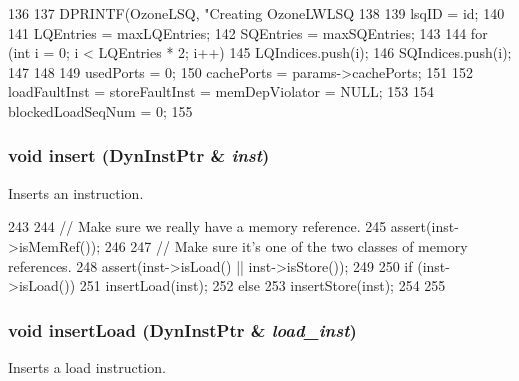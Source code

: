 \begin{DoxyCode}
136 {
137     DPRINTF(OzoneLSQ, "Creating OzoneLWLSQ%
138 
139     lsqID = id;
140 
141     LQEntries = maxLQEntries;
142     SQEntries = maxSQEntries;
143 
144     for (int i = 0; i < LQEntries * 2; i++) {
145         LQIndices.push(i);
146         SQIndices.push(i);
147     }
148 
149     usedPorts = 0;
150     cachePorts = params->cachePorts;
151 
152     loadFaultInst = storeFaultInst = memDepViolator = NULL;
153 
154     blockedLoadSeqNum = 0;
155 }
\end{DoxyCode}
\hypertarget{classOzoneLWLSQ_a773e88db1aa010c3755e603493bf40ec}{
\subsubsection[{insert}]{\setlength{\rightskip}{0pt plus 5cm}void insert ({\bf DynInstPtr} \& {\em inst})}}
\label{classOzoneLWLSQ_a773e88db1aa010c3755e603493bf40ec}
Inserts an instruction. 


\begin{DoxyCode}
243 {
244     // Make sure we really have a memory reference.
245     assert(inst->isMemRef());
246 
247     // Make sure it's one of the two classes of memory references.
248     assert(inst->isLoad() || inst->isStore());
249 
250     if (inst->isLoad()) {
251         insertLoad(inst);
252     } else {
253         insertStore(inst);
254     }
255 }
\end{DoxyCode}
\hypertarget{classOzoneLWLSQ_ad22b3ecafed2bcd9c59fcab049a1cb98}{
\subsubsection[{insertLoad}]{\setlength{\rightskip}{0pt plus 5cm}void insertLoad ({\bf DynInstPtr} \& {\em load\_\-inst})}}
\label{classOzoneLWLSQ_ad22b3ecafed2bcd9c59fcab049a1cb98}
Inserts a load instruction. 



